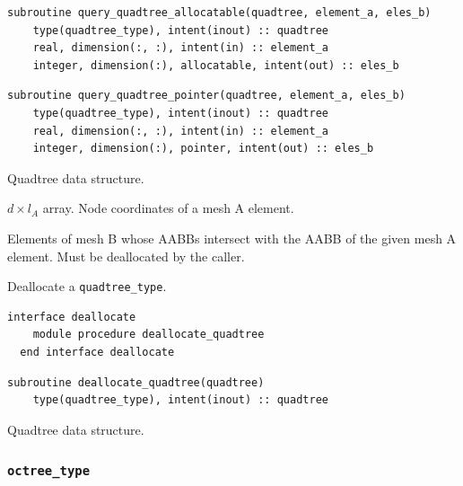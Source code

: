 \documentclass{article}
\begin{document}
\begin{lstlisting}[language=FORTRAN]
  subroutine query_quadtree_allocatable(quadtree, element_a, eles_b)
    type(quadtree_type), intent(inout) :: quadtree
    real, dimension(:, :), intent(in) :: element_a
    integer, dimension(:), allocatable, intent(out) :: eles_b
\end{lstlisting}
  
\begin{lstlisting}[language=FORTRAN]
  subroutine query_quadtree_pointer(quadtree, element_a, eles_b)
    type(quadtree_type), intent(inout) :: quadtree
    real, dimension(:, :), intent(in) :: element_a
    integer, dimension(:), pointer, intent(out) :: eles_b
\end{lstlisting}

\begin{description}[font=\ttfamily\bfseries,leftmargin=2.2\parindent,labelindent=1.7\parindent,noitemsep]
  \item[quadtree] Quadtree data structure.
  \item[element\_a] $d \times l_A$ array. Node coordinates of a mesh A element.
  \item[eles\_b] Elements of mesh B whose AABBs intersect with the AABB of the
    given mesh A element. Must be deallocated by the caller.
\end{description}

\noindent Deallocate a \verb+quadtree_type+.
  
\begin{lstlisting}[language=FORTRAN]
  interface deallocate
    module procedure deallocate_quadtree
  end interface deallocate
\end{lstlisting}
  
\begin{lstlisting}[language=FORTRAN]
  subroutine deallocate_quadtree(quadtree)
    type(quadtree_type), intent(inout) :: quadtree
\end{lstlisting}

\begin{description}[font=\ttfamily\bfseries,leftmargin=2.2\parindent,labelindent=1.7\parindent,noitemsep]
  \item[quadtree] Quadtree data structure.
\end{description}

\subsubsection{\texttt{octree\_type}}\label{sect:octree_query}
  
\end{document}
